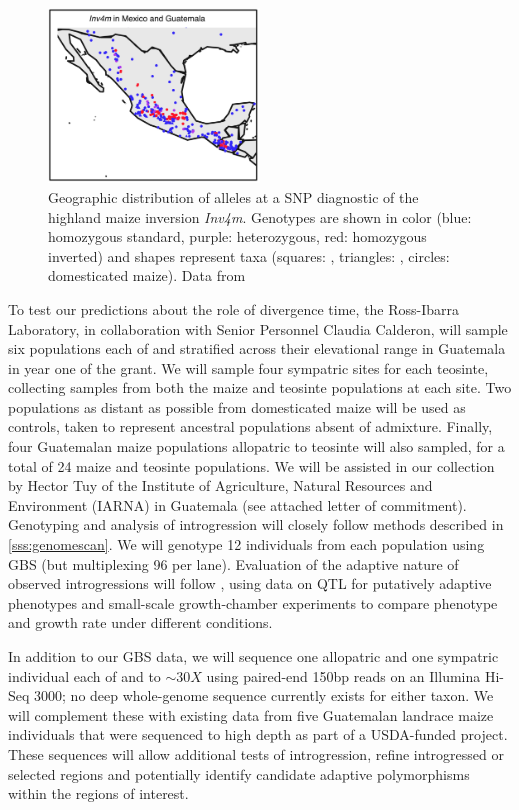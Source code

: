 \begin{figure}
  	\centering
  	\includegraphics[width=0.5\textwidth]{inv4m_lux}
  	\caption{Geographic distribution of alleles at a SNP diagnostic of the highland maize  inversion \emph{Inv4m}.  Genotypes are shown in color (blue: homozygous standard, purple: heterozygous, red: homozygous inverted) and shapes represent taxa (squares: \zm, triangles: \zp, circles: domesticated maize). Data from \citet{Fang2012}  } 
	\label{fig:inv4mmap}
\end{figure} 

To test our predictions about the role of divergence time, the Ross-Ibarra Laboratory, in collaboration with Senior Personnel Claudia Calderon, will sample six populations each of \zl{} and \zh{} stratified across their elevational range in Guatemala in year one of the grant.  
We will sample four sympatric sites for each teosinte, collecting samples from both the maize and teosinte populations at each site.
Two populations as distant as possible from domesticated maize will be used as controls, taken to represent ancestral populations absent of admixture.  
Finally, four Guatemalan maize populations allopatric to teosinte will also sampled, for a total of 24 maize and teosinte populations.
We will be assisted in our collection by Hector Tuy of the Institute of Agriculture, Natural Resources and Environment (IARNA) in Guatemala (see attached letter of commitment).
Genotyping and analysis of introgression will closely follow methods described in \ref{sss:genomescan}. 
We will genotype 12 individuals from each population using GBS (but multiplexing 96 per lane).  
Evaluation of the adaptive nature of observed introgressions will follow \citet{Hufford2013}, using data on QTL for putatively adaptive phenotypes \citep{omori2007qtl,mano2008linkage} and small-scale growth-chamber experiments to compare phenotype and growth rate under different conditions.

In addition to our GBS data, we will sequence one allopatric and one sympatric individual each of \zl{} and \zh{} to $\sim30X$ using paired-end 150bp reads on an Illumina Hi-Seq 3000; no deep whole-genome sequence currently exists for either taxon.
We will complement these with existing data from five Guatemalan landrace maize individuals that were sequenced to high depth as part of a USDA-funded project.   These sequences will allow additional tests of introgression, refine introgressed or selected regions and potentially identify candidate adaptive polymorphisms within the regions of interest.

